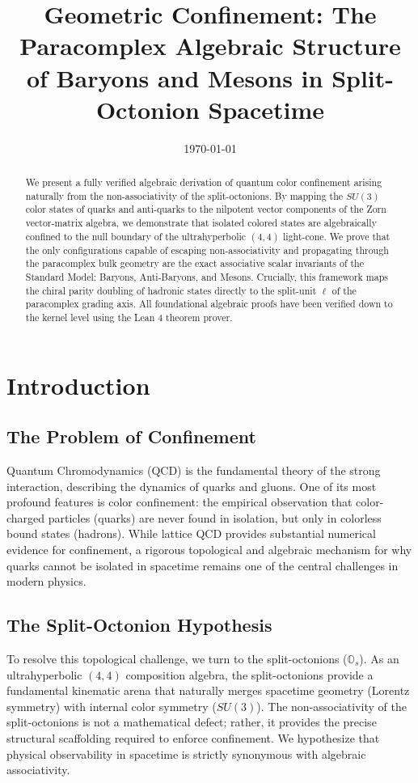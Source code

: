 \documentclass[11pt,a4paper]{article}
\title{Geometric Confinement: The Paracomplex Algebraic Structure of Baryons and Mesons in Split-Octonion Spacetime}
\author{}
\date{\today}
\begin{document}
\maketitle

\begin{abstract}
We present a fully verified algebraic derivation of quantum color confinement arising naturally from the non-associativity of the split-octonions. By mapping the $SU(3)$ color states of quarks and anti-quarks to the nilpotent vector components of the Zorn vector-matrix algebra, we demonstrate that isolated colored states are algebraically confined to the null boundary of the ultrahyperbolic $(4,4)$ light-cone. We prove that the only configurations capable of escaping non-associativity and propagating through the paracomplex bulk geometry are the exact associative scalar invariants of the Standard Model: Baryons, Anti-Baryons, and Mesons. Crucially, this framework maps the chiral parity doubling of hadronic states directly to the split-unit $\ell$ of the paracomplex grading axis. All foundational algebraic proofs have been verified down to the kernel level using the Lean 4 theorem prover.
\end{abstract}

\section{Introduction}

\subsection{The Problem of Confinement}
Quantum Chromodynamics (QCD) is the fundamental theory of the strong interaction, describing the dynamics of quarks and gluons. One of its most profound features is color confinement: the empirical observation that color-charged particles (quarks) are never found in isolation, but only in colorless bound states (hadrons). While lattice QCD provides substantial numerical evidence for confinement, a rigorous topological and algebraic mechanism for why quarks cannot be isolated in spacetime remains one of the central challenges in modern physics.

\subsection{The Split-Octonion Hypothesis}
To resolve this topological challenge, we turn to the split-octonions ($\mathbb{O}_s$). As an ultrahyperbolic $(4,4)$ composition algebra, the split-octonions provide a fundamental kinematic arena that naturally merges spacetime geometry (Lorentz symmetry) with internal color symmetry ($SU(3)$). The non-associativity of the split-octonions is not a mathematical defect; rather, it provides the precise structural scaffolding required to enforce confinement. We hypothesize that physical observability in spacetime is strictly synonymous with algebraic associativity.
\end{document}
